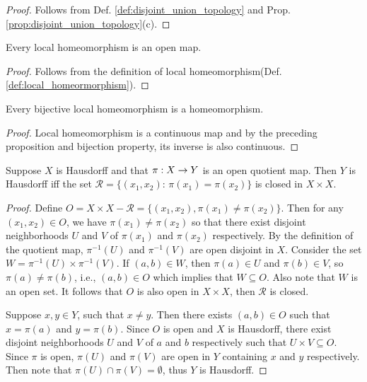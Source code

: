 \documentclass[11pt,a4paper]{article}
\begin{document}
\begin{proof}
Follows from Def. \ref{def:disjoint_union_topology} and Prop. \ref{prop:disjoint_union_topology}(c).
\end{proof}

\begin{proposition}
Every local homeomorphism is an open map.
\end{proposition}

\begin{proof}
Follows from the definition of local homeomorphism(Def. \ref{def:local_homeormorphism}).
\end{proof}

\begin{proposition}
Every bijective local homeomorphism is a homeomorphism.
\end{proposition}

\begin{proof}
Local homeomorphism is a continuous map and by the preceding proposition and bijection property, its inverse is also continuous.
\end{proof}

\begin{proposition}
Suppose $X$ is Hausdorff and that $\pi:X\rightarrow Y$ is an open quotient map. Then $Y$ is Hausdorff iff the set $\mathcal{R} = \{(x_1,x_2):\,\pi(x_1) = \pi(x_2)\}$ is closed in $X\times X$.
\end{proposition}

\begin{proof}
\forward Define $O = X\times X - \mathcal{R} = \{(x_1, x_2), \pi(x_1) \neq \pi(x_2)\}$. Then for any $(x_1,x_2)\in O$, we have $\pi(x_1) \neq \pi(x_2)$ so that there exist disjoint neighborhoods $U$ and $V$ of $\pi(x_1)$ and $\pi(x_2)$ respectively. By the definition of the quotient map, $\pi^{-1}(U)$ and $\pi^{-1}(V)$ are open disjoint in $X$. Consider the set $W = \pi^{-1}(U) \times \pi^{-1}(V)$. If $(a,b)\in W$, then $\pi(a)\in U$ and $\pi(b)\in V$, so $\pi(a)\neq \pi(b)$, i.e., $(a,b)\in O$ which implies that $W\subseteq O$. Also note that $W$ is an open set. It follows that $O$ is also open in $X\times X$, then $\mathcal{R}$ is closed.

\noindent\converse Suppose $x,y\in Y$, such that $x\neq y$. Then there exists $(a,b)\in O$ such that $x = \pi(a)$ and $y = \pi(b)$. Since $O$ is open and $X$ is Hausdorff, there exist disjoint neighborhoods $U$ and $V$ of $a$ and $b$ respectively such that $U \times V \subseteq O$. Since $\pi$ is open, $\pi(U)$ and $\pi(V)$ are open in $Y$ containing $x$ and $y$ respectively. Then note that $\pi(U)\cap \pi(V)=\emptyset$, thus $Y$ is Hausdorff.
\end{proof}
\end{document}
